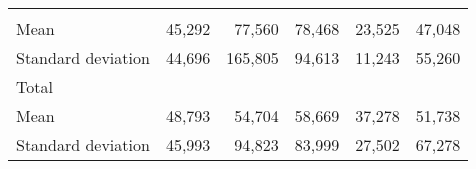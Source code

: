 \begin{tabular}{llllll}
  \multicolumn{1}{r}{} &
  \multicolumn{1}{r}{} &
  \multicolumn{1}{r}{} &
  \multicolumn{1}{r}{} \\
\multicolumn{1}{l}{\hspace{4em}Mean} &
  \multicolumn{1}{|r}{45,292} &
  \multicolumn{1}{r}{77,560} &
  \multicolumn{1}{r}{78,468} &
  \multicolumn{1}{r}{23,525} &
  \multicolumn{1}{r}{47,048} \\
\multicolumn{1}{l}{\hspace{4em}Standard deviation} &
  \multicolumn{1}{|r}{44,696} &
  \multicolumn{1}{r}{165,805} &
  \multicolumn{1}{r}{94,613} &
  \multicolumn{1}{r}{11,243} &
  \multicolumn{1}{r}{55,260} \\
\multicolumn{1}{l}{\hspace{3em}Total} &
  \multicolumn{1}{|r}{} &
  \multicolumn{1}{r}{} &
  \multicolumn{1}{r}{} &
  \multicolumn{1}{r}{} &
  \multicolumn{1}{r}{} \\
\multicolumn{1}{l}{\hspace{4em}Mean} &
  \multicolumn{1}{|r}{48,793} &
  \multicolumn{1}{r}{54,704} &
  \multicolumn{1}{r}{58,669} &
  \multicolumn{1}{r}{37,278} &
  \multicolumn{1}{r}{51,738} \\
\multicolumn{1}{l}{\hspace{4em}Standard deviation} &
  \multicolumn{1}{|r}{45,993} &
  \multicolumn{1}{r}{94,823} &
  \multicolumn{1}{r}{83,999} &
  \multicolumn{1}{r}{27,502} &
  \multicolumn{1}{r}{67,278} \\
\cline{1-6}
\end{tabular}

